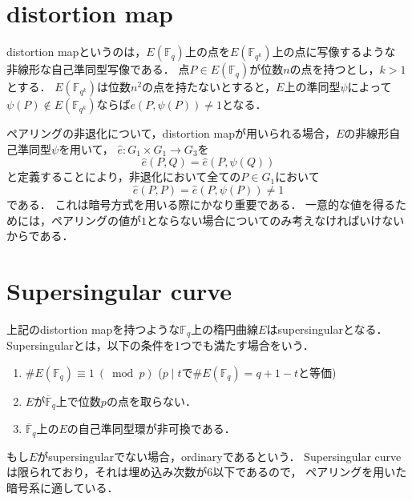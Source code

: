 \section{distortion map}
\par

distortion mapというのは，$E(\mathbb{F} _q)$上の点を$E(\mathbb{F} _{q ^k})$上の点に写像するような
非線形な自己準同型写像である．
点$P \in E(\mathbb{F} _q)$が位数$n$の点を持つとし，$k > 1$とする．
$E(\mathbb{F} _{q ^k})$は位数$n ^2$の点を持たないとすると，$E$上の準同型$\psi$によって
$\psi(P) \notin E(\mathbb{F} _{q ^k})$ならば$e(P, \psi(P)) \not= 1$となる．
\par
ペアリングの非退化について，distortion mapが用いられる場合，$E$の非線形自己準同型$\psi$を用いて，
$\hat{e} : G _1 \times G _1 \to G _3$を
\[
\hat{e}(P, Q) = \hat{e}(P, \psi(Q))
\]
と定義することにより，非退化において全ての$P \in G _1$において
\[
\hat{e}(P, P) = \hat{e}(P, \psi(P)) \not= 1
\]
である．
これは暗号方式を用いる際にかなり重要である．
一意的な値を得るためには，ペアリングの値が$1$とならない場合についてのみ考えなければいけないからである．\\
\par
\section{Supersingular curve}
\par
上記のdistortion mapを持つような$\mathbb{F} _q$上の楕円曲線$E$はsupersingularとなる．
Supersingularとは，以下の条件を1つでも満たす場合をいう．
\begin{enumerate}
  \item $\# E(\mathbb{F} _q) \equiv 1 \ (\bmod p)$
        ($p \mid t$で$\# E(\mathbb{F} _q) = q + 1 - t$と等価)
  \item $E$が$\overline{\mathbb{F}} _q$上で位数$p$の点を取らない．
  \item $\overline{\mathbb{F}} _q$上の$E$の自己準同型環が非可換である．
\end{enumerate}
もし$E$がsupersingularでない場合，ordinaryであるという．
Supersingular curveは限られており，それは埋め込み次数が$6$以下であるので，
ペアリングを用いた暗号系に適している．\\
